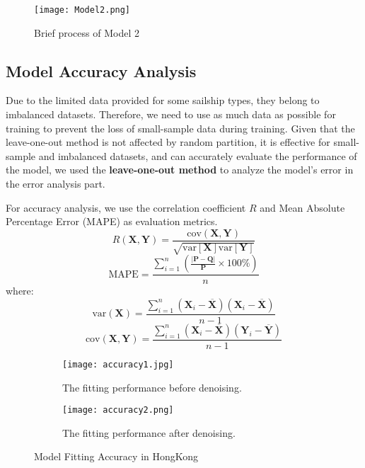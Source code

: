 \documentclass[12pt]{article}  %
\begin{document}
\begin{figure}[htbp]
    \centering
    \texttt{[image: Model2.png]}
    \caption{Brief process of Model 2}\label{fig:Model2}
\end{figure}


\subsection{Model Accuracy Analysis}
Due to the limited data provided for some sailship types, 
they belong to imbalanced datasets. 
Therefore, we need to use as much data as possible for training to prevent the loss of small-sample data during training. 
Given that the leave-one-out method is not affected by random partition, 
it is effective for small-sample and imbalanced datasets, 
and can accurately evaluate the performance of the model, 
we used the \textbf{leave-one-out method} to analyze the model's error in the error analysis part.
  
For accuracy analysis, we use the correlation coefficient $R$ and Mean Absolute Percentage Error (MAPE) as evaluation metrics.
$$R(\textbf{X},\textbf{Y})=\frac{\text{cov}(\textbf{X},\textbf{Y})}{\sqrt{\text{var}[\textbf{X}] \text{var}[\textbf{Y}]}}$$
$$\text{MAPE} = \frac{\sum_{i = 1}^n (\frac{|\textbf{P} - \textbf{Q}|}{\textbf{P}} \times 100\%)}{n}$$
where:
    $$\text{var}(\textbf{X})=\frac{\sum_{i=1}^{n}(\textbf{X}_i-\overline{\textbf{X}})(\textbf{X}_i-\overline{\textbf{X}})}{n-1}$$
    $$\text{cov}(\textbf{X},\textbf{Y})=\frac{\sum_{i=1}^{n}(\textbf{X}_i-\overline{\textbf{X}})(\textbf{Y}_i-\overline{\textbf{Y}})}{n-1}$$

    \begin{figure}[htbp]
        \centering
        \begin{subfigure}[b]{.4\textwidth}
        \texttt{[image: accuracy1.jpg]}
        \caption{The fitting performance before denoising.}\label{subfig:accuracy1}
        \end{subfigure}
        \begin{subfigure}[b]{.4\textwidth}
        \texttt{[image: accuracy2.png]}
        \caption{The fitting performance after denoising.}\label{subfig:accuracy2}
        \end{subfigure}
        \caption{Model Fitting Accuracy in HongKong}\label{fig:accuracy}
    \end{figure} 
\end{document}
